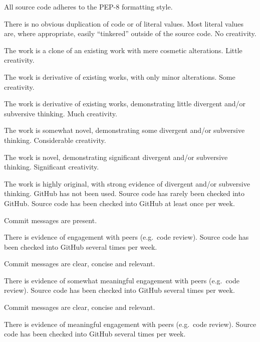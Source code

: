 \documentclass{../fal_assignment}
\begin{document}
\begin{markingrubric}
            \par All source code adheres to the PEP-8 formatting style.
             \par There is no obvious duplication of code or of literal values. Most literal values are, where appropriate, easily ``tinkered'' outside of the source code.  
%
        \grade\fail No creativity.
            \par The work is a clone of an existing work with mere cosmetic alterations.
        \grade Little creativity.
            \par The work is derivative of existing works, with only minor alterations.
        \grade Some creativity.
            \par The work is derivative of existing works, demonstrating little divergent and/or subversive thinking.
        \grade Much creativity.
            \par The work is somewhat novel, demonstrating some divergent and/or subversive thinking.
        \grade Considerable creativity.
            \par The work is novel, demonstrating significant divergent and/or subversive thinking.
        \grade Significant creativity.
            \par The work is highly original, with strong evidence of divergent and/or subversive thinking.
%
        \grade\fail GitHub has not been used.
        \grade Source code has rarely been checked into GitHub.
        \grade Source code  has been checked into GitHub at least once per week.
            \par Commit messages are present.
            \par There is evidence of engagement with peers (e.g.\ code review).
        \grade Source code  has been checked into GitHub several times per week.
            \par Commit messages are clear, concise and relevant.
            \par There is evidence of somewhat meaningful engagement with peers (e.g.\ code review).
        \grade Source code has been checked into GitHub several times per week.
            \par Commit messages are clear, concise and relevant.
            \par There is evidence of meaningful engagement with peers (e.g.\ code review).
        \grade Source code has been checked into GitHub several times per week.

\end{markingrubric}
\end{document}
